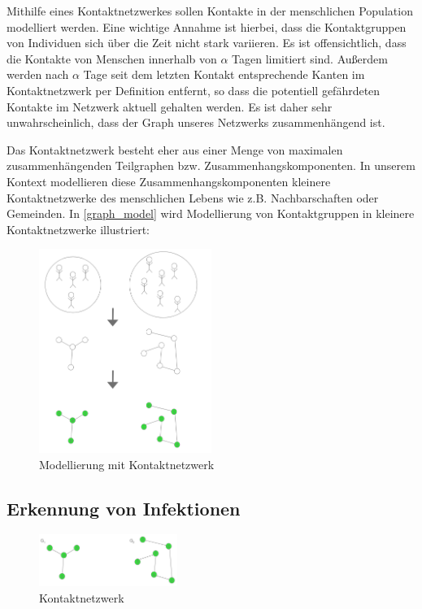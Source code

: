 \documentclass[12pt]{article}
\begin{document}
Mithilfe eines Kontaktnetzwerkes sollen Kontakte in der menschlichen Population modelliert werden. Eine wichtige Annahme ist hierbei, dass die Kontaktgruppen von Individuen sich über die Zeit nicht stark variieren. Es ist offensichtlich, dass die Kontakte von Menschen innerhalb von $\alpha$ Tagen limitiert sind. Außerdem werden nach $\alpha$ Tage seit dem letzten Kontakt entsprechende Kanten im Kontaktnetzwerk per Definition entfernt, so dass die potentiell gefährdeten Kontakte im Netzwerk aktuell gehalten werden. Es ist daher sehr unwahrscheinlich, dass der Graph unseres Netzwerks zusammenhängend ist. 

Das Kontaktnetzwerk besteht eher aus einer Menge von maximalen zusammenhängenden Teilgraphen bzw. Zusammenhangskomponenten. In unserem Kontext modellieren diese Zusammenhangskomponenten kleinere Kontaktnetzwerke des menschlichen Lebens wie z.B. Nachbarschaften oder Gemeinden. In \ref{graph_model} wird Modellierung von Kontaktgruppen in kleinere Kontaktnetzwerke illustriert:

\begin{figure}[h]
    \centering
    \includegraphics[width=0.5\textwidth]{res/graph_model}
    \caption{Modellierung mit Kontaktnetzwerk}
    \label{fig:graph_model}
\end{figure}

\newpage

\subsection{Erkennung von Infektionen}

\begin{figure}
    \centering
    \includegraphics[width=0.4\textwidth]{res/detection_setup}
    \caption{Kontaktnetzwerk}
    \label{fig:detection_setup}
\end{figure}
\end{document}
